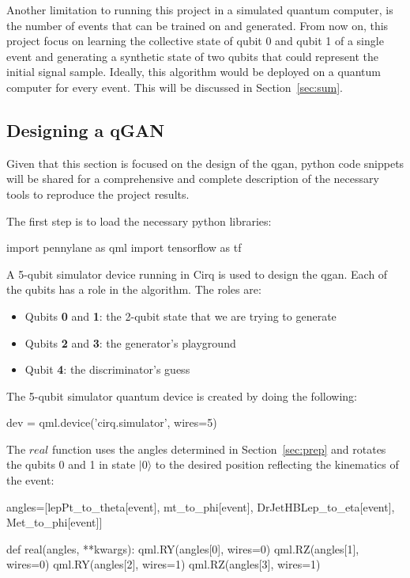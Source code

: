 Another limitation to running this project in a simulated quantum computer, is
the number of events that can be trained on and generated. From now on, this
project focus on learning the collective state of qubit 0 and qubit 1 of a 
single event and generating a synthetic state of two qubits that could represent
the initial signal sample. Ideally, this algorithm would be deployed on a quantum
computer for every event. This will be discussed in Section~\ref{sec:sum}.

\subsection{Designing a qGAN}
\label{sec:qgan}

Given that this section is focused on the design of the \gls{qgan}, python code 
snippets will be shared for a comprehensive and complete description of the 
necessary tools to reproduce the project results.

The first step is to load the necessary python libraries:
\begin{python}
import pennylane as qml
import tensorflow as tf
\end{python}

A 5-qubit simulator device running in Cirq is used to design the \gls{qgan}. Each
of the qubits has a role in the algorithm. The roles are:
\begin{itemize}
    \item Qubits \textbf{0} and \textbf{1}: the 2-qubit state that we are trying
    to generate
    \item Qubits \textbf{2} and \textbf{3}: the generator's playground
    \item Qubit \textbf{4}: the discriminator's guess
\end{itemize}

The 5-qubit simulator quantum device is created by doing the following:

\begin{python}
dev = qml.device('cirq.simulator', wires=5)
\end{python}

The $real$ function uses the angles determined in Section~\ref{sec:prep} and 
rotates the qubits 0 and 1 in state $\vert 0 \rangle$ to the desired position 
reflecting the kinematics of the event:
\begin{python}
angles=[lepPt_to_theta[event],
        mt_to_phi[event],
        DrJetHBLep_to_eta[event],
        Met_to_phi[event]]

def real(angles, **kwargs):
    qml.RY(angles[0], wires=0)
    qml.RZ(angles[1], wires=0)
    qml.RY(angles[2], wires=1)
    qml.RZ(angles[3], wires=1)
\end{python}

